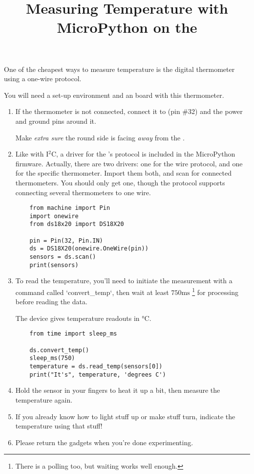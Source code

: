 \documentclass{../tutorial}
\title{Measuring Temperature with MicroPython on the \abbr{ESP32}}
\begin{document}
    One of the cheapest ways to measure temperature is the 
    digital thermometer using a one-wire protocol.

    You will need a set-up environment and an  board with
    this thermometer.

\begin{enumerate}

\item
    If the thermometer is not connected, connect it to  (pin \#32)
    and the power and ground pins around it.

    Make \emph{extra sure} the round side is facing \emph{away} from the
    .

\item
    Like with I$^2$C, a driver for the 's protocol is included
    in the MicroPython firmware.
    Actually, there are two drivers: one for the wire protocol, and one for the
    specific thermometer.
    Import them both, and scan for connected thermometers.
    You should only get one, though the protocol supports connecting
    several thermometers to one wire.

    \begin{lstlisting}
    from machine import Pin
    import onewire
    from ds18x20 import DS18X20

    pin = Pin(32, Pin.IN)
    ds = DS18X20(onewire.OneWire(pin))
    sensors = ds.scan()
    print(sensors)
    \end{lstlisting}

\item
    To read the temperature, you'll need to initiate the measurement with
    a command called `convert_temp`, then wait at least $750 \si{\milli\second}$
    \footnote{There is a polling  too, but waiting works well enough.}
    for processing before reading the data.

    The device gives temperature readouts in $\si{\celsius}$.

    \begin{lstlisting}
    from time import sleep_ms

    ds.convert_temp()
    sleep_ms(750)
    temperature = ds.read_temp(sensors[0])
    print("It's", temperature, 'degrees C')
    \end{lstlisting}


\item
    Hold the sensor in your fingers to heat it up a bit, then
    measure the temperature again.


\item
    If you already know how to light stuff up or make stuff turn,
    indicate the temperature using that stuff!


\item
    Please return the gadgets when you're done experimenting.

\end{enumerate}
\end{document}
